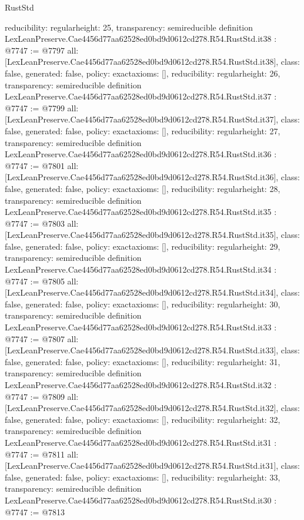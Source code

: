 \begin{lexlean}{RustStd}
\begin{coremodule}
{  reducibility: regular{height: 25},
  transparency: semireducible
}
definition LexLeanPreserve.Cae4456d77aa62528ed0bd9d0612cd278.R54.RustStd.it38 : @7747 := @7797 {
  all: [LexLeanPreserve.Cae4456d77aa62528ed0bd9d0612cd278.R54.RustStd.it38],
  class: false,
  generated: false,
  policy: exact{axioms: []},
  reducibility: regular{height: 26},
  transparency: semireducible
}
definition LexLeanPreserve.Cae4456d77aa62528ed0bd9d0612cd278.R54.RustStd.it37 : @7747 := @7799 {
  all: [LexLeanPreserve.Cae4456d77aa62528ed0bd9d0612cd278.R54.RustStd.it37],
  class: false,
  generated: false,
  policy: exact{axioms: []},
  reducibility: regular{height: 27},
  transparency: semireducible
}
definition LexLeanPreserve.Cae4456d77aa62528ed0bd9d0612cd278.R54.RustStd.it36 : @7747 := @7801 {
  all: [LexLeanPreserve.Cae4456d77aa62528ed0bd9d0612cd278.R54.RustStd.it36],
  class: false,
  generated: false,
  policy: exact{axioms: []},
  reducibility: regular{height: 28},
  transparency: semireducible
}
definition LexLeanPreserve.Cae4456d77aa62528ed0bd9d0612cd278.R54.RustStd.it35 : @7747 := @7803 {
  all: [LexLeanPreserve.Cae4456d77aa62528ed0bd9d0612cd278.R54.RustStd.it35],
  class: false,
  generated: false,
  policy: exact{axioms: []},
  reducibility: regular{height: 29},
  transparency: semireducible
}
definition LexLeanPreserve.Cae4456d77aa62528ed0bd9d0612cd278.R54.RustStd.it34 : @7747 := @7805 {
  all: [LexLeanPreserve.Cae4456d77aa62528ed0bd9d0612cd278.R54.RustStd.it34],
  class: false,
  generated: false,
  policy: exact{axioms: []},
  reducibility: regular{height: 30},
  transparency: semireducible
}
definition LexLeanPreserve.Cae4456d77aa62528ed0bd9d0612cd278.R54.RustStd.it33 : @7747 := @7807 {
  all: [LexLeanPreserve.Cae4456d77aa62528ed0bd9d0612cd278.R54.RustStd.it33],
  class: false,
  generated: false,
  policy: exact{axioms: []},
  reducibility: regular{height: 31},
  transparency: semireducible
}
definition LexLeanPreserve.Cae4456d77aa62528ed0bd9d0612cd278.R54.RustStd.it32 : @7747 := @7809 {
  all: [LexLeanPreserve.Cae4456d77aa62528ed0bd9d0612cd278.R54.RustStd.it32],
  class: false,
  generated: false,
  policy: exact{axioms: []},
  reducibility: regular{height: 32},
  transparency: semireducible
}
definition LexLeanPreserve.Cae4456d77aa62528ed0bd9d0612cd278.R54.RustStd.it31 : @7747 := @7811 {
  all: [LexLeanPreserve.Cae4456d77aa62528ed0bd9d0612cd278.R54.RustStd.it31],
  class: false,
  generated: false,
  policy: exact{axioms: []},
  reducibility: regular{height: 33},
  transparency: semireducible
}
definition LexLeanPreserve.Cae4456d77aa62528ed0bd9d0612cd278.R54.RustStd.it30 : @7747 := @7813 {
}
\end{coremodule}
\end{lexlean}
